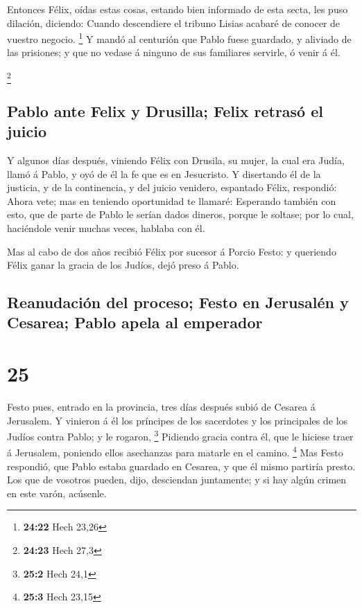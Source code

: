  Entonces Félix, oídas estas cosas, estando bien informado
de esta secta, les puso dilación, diciendo: Cuando descendiere el
tribuno Lisias acabaré de conocer de vuestro negocio. \footnote{\textbf{24:22}
  Hech 23,26}  Y mandó al centurión que Pablo fuese
guardado, y aliviado de las prisiones; y que no vedase á ninguno de sus
familiares servirle, ó venir á él.

\footnote{\textbf{24:23} Hech 27,3}

\hypertarget{pablo-ante-felix-y-drusilla-felix-retrasuxf3-el-juicio}{%
\subsection{Pablo ante Felix y Drusilla; Felix retrasó el
juicio}\label{pablo-ante-felix-y-drusilla-felix-retrasuxf3-el-juicio}}

 Y algunos días después, viniendo Félix con Drusila, su
mujer, la cual era Judía, llamó á Pablo, y oyó de él la fe que es en
Jesucristo.  Y disertando él de la justicia, y de la
continencia, y del juicio venidero, espantado Félix, respondió: Ahora
vete; mas en teniendo oportunidad te llamaré:  Esperando
también con esto, que de parte de Pablo le serían dados dineros, porque
le soltase; por lo cual, haciéndole venir muchas veces, hablaba con él.

 Mas al cabo de dos años recibió Félix por sucesor á Porcio
Festo: y queriendo Félix ganar la gracia de los Judíos, dejó preso á
Pablo.

\hypertarget{reanudaciuxf3n-del-proceso-festo-en-jerusaluxe9n-y-cesarea-pablo-apela-al-emperador}{%
\subsection{Reanudación del proceso; Festo en Jerusalén y Cesarea; Pablo
apela al
emperador}\label{reanudaciuxf3n-del-proceso-festo-en-jerusaluxe9n-y-cesarea-pablo-apela-al-emperador}}

\hypertarget{section-24}{%
\section{25}\label{section-24}}

 Festo pues, entrado en la provincia, tres días después
subió de Cesarea á Jerusalem.  Y vinieron á él los príncipes
de los sacerdotes y los principales de los Judíos contra Pablo; y le
rogaron, \footnote{\textbf{25:2} Hech 24,1}  Pidiendo gracia
contra él, que le hiciese traer á Jerusalem, poniendo ellos asechanzas
para matarle en el camino. \footnote{\textbf{25:3} Hech 23,15}
 Mas Festo respondió, que Pablo estaba guardado en Cesarea,
y que él mismo partiría presto.  Los que de vosotros pueden,
dijo, desciendan juntamente; y si hay algún crimen en este varón,
acúsenle.


